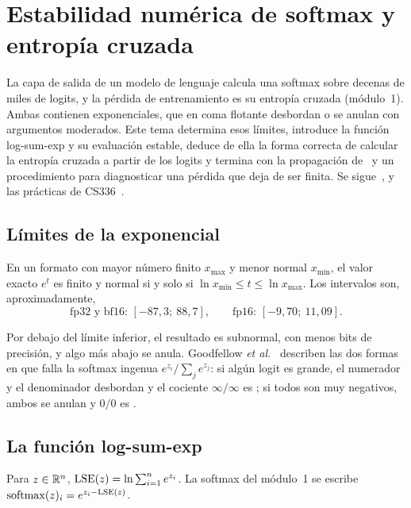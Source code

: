 \chapter{Estabilidad numérica de softmax y entropía cruzada}
\label{tema:6}

La capa de salida de un modelo de lenguaje calcula una softmax sobre decenas de miles de logits, y la pérdida de entrenamiento es su entropía cruzada (módulo~1). Ambas contienen exponenciales, que en coma flotante desbordan o se anulan con argumentos moderados. Este tema determina esos límites, introduce la función log-sum-exp y su evaluación estable, deduce de ella la forma correcta de calcular la entropía cruzada a partir de los logits y termina con la propagación de \NaN\ y un procedimiento para diagnosticar una pérdida que deja de ser finita. Se sigue~\cite[§4.1]{gbc}, \cite[§4.5.2]{d2l} y las prácticas de CS336~\cite{cs336}.

\section{Límites de la exponencial}

\begin{proposicion}\label{prop:exp-rango}
En un formato con mayor número finito $x_{\max}$ y menor normal $x_{\min}$, el valor exacto $e^{t}$ es finito y normal si y solo si $\ln x_{\min}\le t\le\ln x_{\max}$. Los intervalos son, aproximadamente,
\[
\text{fp32 y bf16: }[-87{,}3;\ 88{,}7],\qquad \text{fp16: }[-9{,}70;\ 11{,}09].
\]
\end{proposicion}

Por debajo del límite inferior, el resultado es subnormal, con menos bits de precisión, y algo más abajo se anula. Goodfellow \emph{et al.}~\cite[§4.1]{gbc} describen las dos formas en que falla la softmax ingenua $e^{z_i}/\sum_je^{z_j}$: si algún logit es grande, el numerador y el denominador desbordan y el cociente $\infty/\infty$ es \NaN; si todos son muy negativos, ambos se anulan y $0/0$ es \NaN.

\section{La función log-sum-exp}

\begin{definicion}\label{def:lse}
Para $z\in\mathbb{R}^{n}$, $\operatorname{LSE}(z)=\ln\sum_{i=1}^{n}e^{z_i}$. La softmax del módulo~1 se escribe $\operatorname{softmax}(z)_i=e^{z_i-\operatorname{LSE}(z)}$.
\end{definicion}

